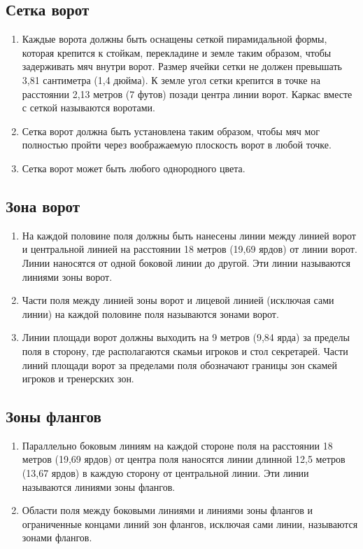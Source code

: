 \documentclass[../main.tex]{subfiles}
\begin{document}
\subsection{Сетка ворот}
\begin{enumerate}
  \item Каждые ворота должны быть оснащены сеткой пирамидальной формы, которая крепится к стойкам, перекладине и земле таким образом, чтобы задерживать мяч внутри ворот.\newline
  Размер ячейки сетки не должен превышать 3,81 сантиметра (1,4 дюйма).\newline
  К земле угол сетки крепится в точке на расстоянии 2,13 метров (7 футов) позади центра линии ворот.\newline
  Каркас вместе с сеткой называются воротами.
  \item Сетка ворот должна быть установлена таким образом, чтобы мяч мог полностью пройти через воображаемую плоскость ворот в любой точке.
  \item Сетка ворот может быть любого однородного цвета.
\end{enumerate}

\subsection{Зона ворот}
\begin{enumerate}
  \item На каждой половине поля должны быть нанесены линии между линией ворот и центральной линией на расстоянии 18 метров (19,69 ярдов) от линии ворот. Линии наносятся от одной боковой линии до другой. Эти линии называются линиями зоны ворот.
  \item Части поля между линией зоны ворот и лицевой линией (исключая сами линии) на каждой половине поля называются зонами ворот.
  \item Линии площади ворот должны выходить на 9 метров (9,84 ярда) за пределы поля в сторону, где располагаются скамьи игроков и стол секретарей. Части линий площади ворот за пределами поля обозначают границы зон скамей игроков и тренерских зон.
\end{enumerate}

\subsection{Зоны флангов}
\begin{enumerate}
  \item Параллельно боковым линиям на каждой стороне поля на расстоянии 18 метров (19,69 ярдов) от центра поля наносятся линии длинной 12,5 метров (13,67 ярдов) в каждую сторону от центральной линии. Эти линии называются линиями зоны флангов.
  \item Области поля между боковыми линиями и линиями зоны флангов и ограниченные концами линий зон флангов, исключая сами линии, называются зонами флангов.
\end{enumerate}
\end{document}
